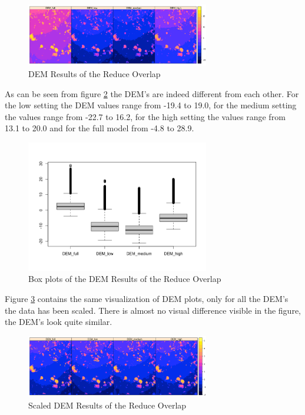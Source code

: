 \documentclass{isprs} %
\begin{document}
\begin{figure}[h]
    \centering
    \includegraphics[width=8cm]{DemPlots.png}
    \caption{DEM Results of the Reduce Overlap}
    \label{fig:DemPlot_unscaled}
\end{figure}

As can be seen from figure \ref{fig:BoxPlot_unscaled} the DEM's are indeed different from each other. 
For the low setting the DEM values range from -19.4 to 19.0, for the medium setting the values range from -22.7 to 16.2, for the high setting the values range from 13.1 to 20.0 and for the full model from -4.8 to 28.9.

\begin{figure}[h]
    \centering
    \includegraphics[width=8cm]{DemBoxplot.png}
    \caption{Box plots of the DEM Results of the Reduce Overlap}
    \label{fig:BoxPlot_unscaled}
\end{figure}

Figure \ref{fig:DemPlot_scaled} contains the same visualization of DEM plots, only for all the DEM's the data has been scaled.
There is almost no visual difference visible in the figure, the DEM's look quite similar.

\begin{figure}[h]
    \centering
    \includegraphics[width=8cm]{DemPlots_scaled.png}
    \caption{Scaled DEM Results of the Reduce Overlap}
    \label{fig:DemPlot_scaled}
\end{figure}
\end{document}
